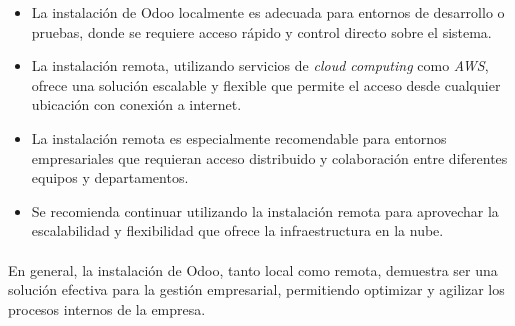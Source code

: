 \begin{itemize}
    \item La instalación de Odoo localmente es adecuada para entornos de desarrollo o pruebas, donde se requiere acceso rápido y control directo sobre el sistema.
    \item La instalación remota, utilizando servicios de \textit{cloud computing} como \textit{AWS}, ofrece una solución escalable y flexible que permite el acceso desde cualquier ubicación con conexión a internet.
    \item La instalación remota es especialmente recomendable para entornos empresariales que requieran acceso distribuido y colaboración entre diferentes equipos y departamentos.
    \item Se recomienda continuar utilizando la instalación remota para aprovechar la escalabilidad y flexibilidad que ofrece la infraestructura en la nube.
\end{itemize}
\paragraph{}
En general, la instalación de Odoo, tanto local como remota, demuestra ser una solución efectiva para la gestión empresarial, permitiendo optimizar y agilizar los procesos internos de la empresa.
